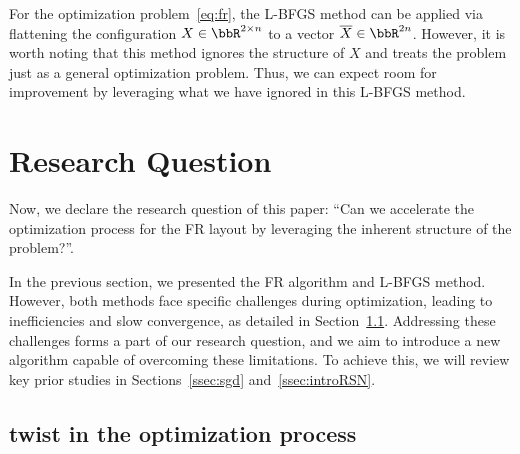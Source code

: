 \documentclass[dvipdfmx,lettersize,journal]{IEEEtran}
\begin{document}
For the optimization problem~\eqref{eq:fr}, the L-BFGS method can be applied via flattening the configuration $X \in \bbR^{2 \times n}$ to a vector $\overline{X} \in \bbR^{2n}$.
However, it is worth noting that this method ignores the structure of $X$ and treats the problem just as a general optimization problem.
Thus, we can expect room for improvement by leveraging what we have ignored in this L-BFGS method.

\section{Research Question}\label{sec:RQ}

Now, we declare the research question of this paper: ``Can we accelerate the optimization process for the FR layout by leveraging the inherent structure of the problem?''.

In the previous section, we presented the FR algorithm and L-BFGS method. However, both methods face specific challenges during optimization, leading to inefficiencies and slow convergence, as detailed in Section~\ref{ssec:twist}.
Addressing these challenges forms a part of our research question, and we aim to introduce a new algorithm capable of overcoming these limitations. To achieve this, we will review key prior studies in Sections~\ref{ssec:sgd} and~\ref{ssec:introRSN}.

\subsection{twist in the optimization process}\label{ssec:twist}
\end{document}
